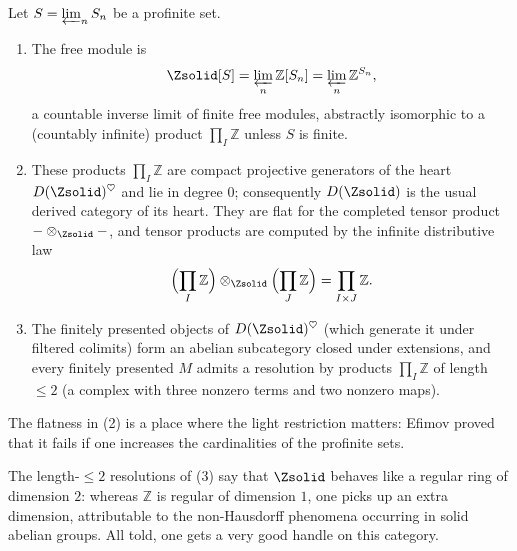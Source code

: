 \begin{proposition}
\label{prop:1:Zsolid-structure}
Let $S=\varprojlim_n S_n$ be a profinite set.
\begin{enumerate}
\item The free module is
\begin{equation}
\label{eq:1:Zsolid-free-module}
\Zsolid[S]=\varprojlim_n \mathbb{Z}[S_n]=\varprojlim_n \mathbb{Z}^{S_n},
\end{equation}
a countable inverse limit of finite free modules, abstractly isomorphic to a
(countably infinite) product $\prod_I\mathbb{Z}$ unless $S$ is finite.
\item These products $\prod_I\mathbb{Z}$ are compact projective generators of the
heart $D(\Zsolid)^{\heartsuit}$ and lie in degree $0$; consequently $D(\Zsolid)$
is the usual derived category of its heart. They are flat for the completed
tensor product $-\otimes_{\Zsolid}-$, and tensor products are computed by the
infinite distributive law
\begin{equation*}
\Bigl(\prod_I\mathbb{Z}\Bigr)\otimes_{\Zsolid}\Bigl(\prod_J\mathbb{Z}\Bigr)
=\prod_{I\times J}\mathbb{Z}.
\end{equation*}
\item The finitely presented objects of $D(\Zsolid)^{\heartsuit}$ (which generate
it under filtered colimits) form an abelian subcategory closed under extensions,
and every finitely presented $M$ admits a resolution by products
$\prod_I\mathbb{Z}$ of length $\leq 2$ (a complex with three nonzero terms and two
nonzero maps).
\end{enumerate}
\end{proposition}

\begin{remark}
\label{rmk:1:lightness-used}
The flatness in (2) is a place where the light
restriction matters: Efimov proved that it fails if one increases the
cardinalities of the profinite sets.
\end{remark}

\begin{remark}
\label{rmk:1:Zsolid-regular-dim-2}
The length-$\leq 2$ resolutions of (3) say that
$\Zsolid$ behaves like a regular ring of dimension $2$: whereas $\mathbb{Z}$ is
regular of dimension $1$, one picks up an extra dimension, attributable to the
non-Hausdorff phenomena occurring in solid abelian groups. All told, one gets a
very good handle on this category.
\end{remark}

